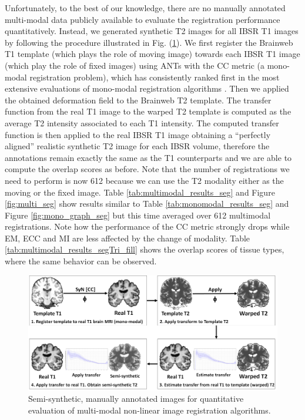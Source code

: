 Unfortunately, to the best of our knowledge, there are no manually annotated multi-modal data publicly available to evaluate the registration performance quantitatively. Instead, we generated synthetic T2 images for all IBSR T1 images by following the procedure illustrated in Fig. (\ref{fig:semi_synthetic_image_creation}). We first register the Brainweb T1 template (which plays the role of moving image) towards each IBSR T1 image (which play the role of fixed images) using ANTs with the CC metric (a mono-modal registration problem), which has consistently ranked first in the most extensive evaluations of mono-modal registration algorithms \citep{Klein2009, Klein2010, Rohlfing2012}. Then we applied the obtained deformation field to the Brainweb T2 template. The transfer function from the real T1 image to the warped T2 template is computed as the average T2 intensity associated to each T1 intensity. The computed transfer function is then applied to the real IBSR T1 image obtaining a ``perfectly aligned'' realistic synthetic T2 image for each IBSR volume, therefore the annotations remain exactly the same as the T1 counterparts and we are able to compute the overlap scores as before. Note that the number of registrations we need to perform is now 612 because we can use the T2 modality either as the moving or the fixed image. Table \ref{tab:multimodal_results_seg} and Figure \ref{fig:multi_seg} show results similar to Table \ref{tab:monomodal_results_seg} and Figure \ref{fig:mono_graph_seg} but this time averaged over 612 multimodal registrations. Note how the performance of the CC metric strongly drops while EM, ECC and MI are less affected by the change of modality. Table \ref{tab:multimodal_results_segTri_fill} shows the overlap scores of tissue types, where the same behavior can be observed.\\

\begin{figure}[t!]
\centering
    \includegraphics[width=\linewidth]{./images/semi_synthetic_image_creation.png}
    \caption{Semi-synthetic, manually annotated images for quantitative evaluation of multi-modal non-linear image registration algorithms.}
\label{fig:semi_synthetic_image_creation}
\end{figure}

